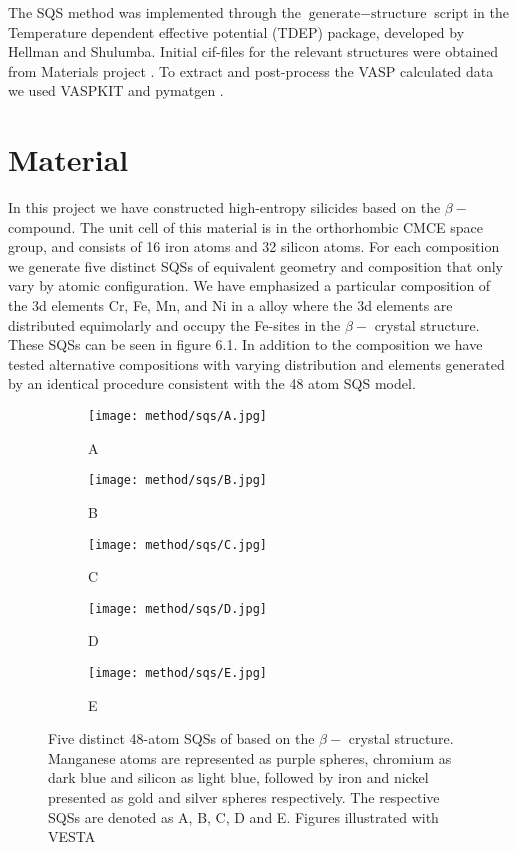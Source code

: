 The SQS method was implemented through the $\text{generate}-\text{structure}$ script in the Temperature dependent effective potential (TDEP) package, developed by Hellman and Shulumba. Initial cif-files for the relevant structures were obtained from Materials project \cite{Jain2013}. To extract and post-process the VASP calculated data we used VASPKIT \cite{vaspkit} and pymatgen \cite{pymatgen}. 


\section{Material}
In this project we have constructed high-entropy silicides based on the $\beta-$  compound. The unit cell of this material is in the orthorhombic CMCE space group, and consists of 16 iron atoms and 32 silicon atoms. For each composition we generate five distinct SQSs of equivalent geometry and composition that only vary by atomic configuration. We have emphasized a particular composition of the 3d elements Cr, Fe, Mn, and Ni in a  alloy where the 3d elements are distributed equimolarly and occupy the Fe-sites in the $\beta-$  crystal structure. These SQSs can be seen in figure 6.1. In addition to the  composition we have tested alternative compositions with varying distribution and elements generated by an identical procedure consistent with the 48 atom SQS model.

\begin{figure}[H]
\begin{subfigure}{0.5\textwidth}
\texttt{[image: method/sqs/A.jpg]}
\caption{A}
\end{subfigure}
\hfill
\begin{subfigure}{0.5\textwidth}
\texttt{[image: method/sqs/B.jpg]}
\caption{B}
\end{subfigure}
\begin{subfigure}{0.5\textwidth}
\texttt{[image: method/sqs/C.jpg]}
\caption{C}
\end{subfigure}
\hfill
\begin{subfigure}{0.5\textwidth}
\texttt{[image: method/sqs/D.jpg]}
\caption{D}
\end{subfigure}
\begin{subfigure}{0.5\textwidth}
\texttt{[image: method/sqs/E.jpg]}
\caption{E}
\end{subfigure}
\caption{Five distinct 48-atom SQSs of  based on the $\beta-$  crystal structure. Manganese atoms are represented as purple spheres, chromium as dark blue and silicon as light blue, followed by iron and nickel presented as gold and silver spheres respectively. The respective SQSs are denoted as A, B, C, D and E. Figures illustrated with VESTA \cite{vesta}}
\label{sqs_FeSi2}
\end{figure}
